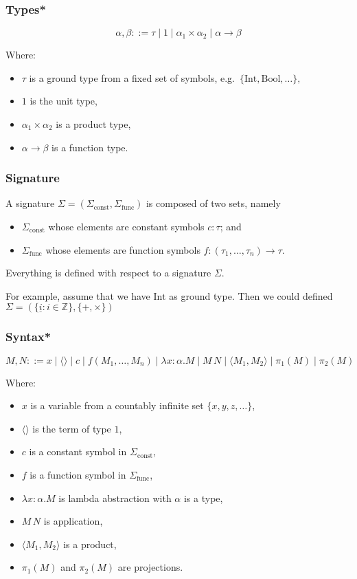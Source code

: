 \documentclass[aspectratio=169]{beamer}
\begin{document}
\begin{frame}
\frametitle{Types*}
\[
\alpha, \beta ::= \tau \mid 1 \mid \alpha_1 \times \alpha_2 \mid \alpha \rightarrow \beta
\]

Where:
\begin{itemize}
    \item $\tau$ is a ground type from a fixed set of symbols, e.g.\ $\{\text{Int}, \text{Bool}, \ldots\},$
    \item $1$ is the unit type,
    \item $\alpha_1 \times \alpha_2$ is a product type,
    \item $\alpha \rightarrow \beta$ is a function type.
\end{itemize}
\end{frame}

\begin{frame}
\frametitle{Signature}
A signature $\Sigma = (\Sigma_{\text{const}}, \Sigma_{\text{func}})$ is composed of two sets, namely
\begin{itemize}
    \item $\Sigma_{\text{const}}$ whose elements are constant symbols $c : \tau$; and
    \item $\Sigma_{\text{func}}$ whose elements are function symbols $f : (\tau_1, \ldots, \tau_n) \to \tau$.
\end{itemize}
Everything is defined with respect to a signature $\Sigma$.

\medskip

For example, assume that we have $\text{Int}$ as ground type.
Then we could defined $\Sigma = \left(\{\underline{i} : i \in \mathbb{Z}\}, \{+, \times\}\right)$ 

\end{frame}

\begin{frame}
\frametitle{Syntax*}

\[
M, N ::= x \mid \langle \rangle \mid c \mid f(M_1, \ldots, M_n) \mid \lambda x: \alpha. M \mid M \, N \mid \langle M_1, M_2 \rangle \mid \pi_1(M) \mid \pi_2(M)
\]

Where:
\begin{itemize}
    \item $x$ is a variable from a countably infinite set $\{x, y, z, \ldots \}$,
    \item $\langle \rangle$ is the term of type $1$,
    \item $c$ is a constant symbol in $\Sigma_{\text{const}}$,
    \item $f$ is a function symbol in $\Sigma_{\text{func}}$,
    \item $\lambda x: \alpha. M$ is lambda abstraction with $\alpha$ is a type,
    \item $M\, N$ is application,
    \item $\langle M_1, M_2 \rangle$ is a product,
    \item $\pi_1(M)$ and $\pi_2(M)$ are projections.
\end{itemize}
\end{frame}
\end{document}
